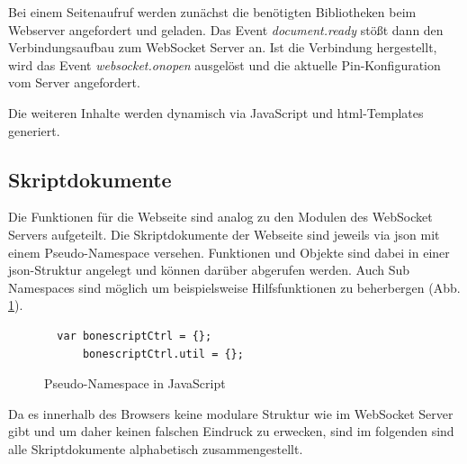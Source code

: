 Bei einem Seitenaufruf werden zunächst die benötigten Bibliotheken beim Webserver angefordert und geladen. Das Event \textit{document.ready} stößt dann den Verbindungsaufbau zum WebSocket Server an. Ist die Verbindung hergestellt, wird das Event \textit{websocket.onopen} ausgelöst und die aktuelle Pin-Konfiguration vom Server angefordert.

Die weiteren Inhalte werden dynamisch via JavaScript und \gls{html}-Templates generiert.


\subsection{Skriptdokumente}
Die Funktionen für die Webseite sind analog zu den Modulen des WebSocket Servers aufgeteilt. Die Skriptdokumente der Webseite sind jeweils via \gls{json} mit einem Pseudo-Namespace versehen. Funktionen und Objekte sind dabei in einer \gls{json}-Struktur angelegt und können darüber abgerufen werden. Auch Sub Namespaces sind möglich um beispielsweise Hilfsfunktionen zu beherbergen (Abb. \ref{lst:pseudeNamespaceJS}).

\begin{figure}[ht]
  \begin{lstlisting}
  var bonescriptCtrl = {};
      bonescriptCtrl.util = {};
  \end{lstlisting}
  \caption{Pseudo-Namespace in JavaScript}
  \label{lst:pseudeNamespaceJS}
\end{figure}

Da es innerhalb des Browsers keine modulare Struktur wie im WebSocket Server gibt und um daher keinen falschen Eindruck zu erwecken, sind im folgenden sind alle Skriptdokumente alphabetisch zusammengestellt.


